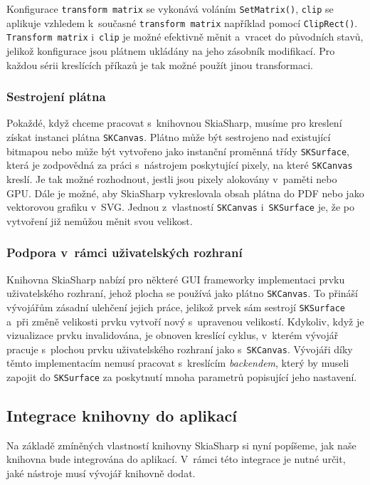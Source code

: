 Konfigurace \texttt{transform matrix} se vykonává voláním \texttt{SetMatrix()}, \texttt{clip} se aplikuje vzhledem k~současné \texttt{transform matrix} například pomocí \texttt{ClipRect()}. \texttt{Transform matrix} i~\texttt{clip} je možné efektivně měnit a~vracet do původních stavů, jelikož konfigurace jsou plátnem ukládány na jeho zásobník modifikací. Pro každou sérii kreslících příkazů je tak možné použít jinou transformaci.

\subsubsection*{Sestrojení plátna}
Pokaždé, když chceme pracovat s~knihovnou SkiaSharp, musíme pro kreslení získat instanci plátna \texttt{SKCanvas}. Plátno může být sestrojeno nad existující bitmapou nebo může být vytvořeno jako instanční proměnná třídy \texttt{SKSurface}, která je zodpovědná za práci s~nástrojem poskytující pixely, na které \texttt{SKCanvas} kreslí. Je tak možné rozhodnout, jestli jsou pixely alokovány v~paměti nebo GPU. Dále je možné, aby SkiaSharp vykreslovala obsah plátna do PDF nebo jako vektorovou grafiku v~SVG. Jednou z~vlastností \texttt{SKCanvas} i~\texttt{SKSurface} je, že po vytvoření již nemůžou měnit svou velikost.

\newpage
\subsubsection*{Podpora v~rámci uživatelských rozhraní}
\label{kap3:skia_ui_elements}
Knihovna SkiaSharp nabízí pro některé GUI frameworky implementaci prvku uživatelského rozhraní, jehož plocha se používá jako plátno \texttt{SKCanvas}.
To přináší vývojářům zásadní ulehčení jejich práce, jelikož prvek sám sestrojí \texttt{SKSurface} a~při změně velikosti prvku vytvoří nový s~upravenou velikostí. Kdykoliv, když je vizualizace prvku invalidována, je obnoven kreslící cyklus, v~kterém vývojář pracuje s~plochou prvku uživatelského rozhraní jako s~\texttt{SKCanvas}. Vývojáři díky těmto implementacím nemusí pracovat s~kreslícím \textit{backendem}, který by museli zapojit do \texttt{SKSurface} za poskytnutí mnoha parametrů popisující jeho nastavení.

\subsection{Integrace knihovny do aplikací}
Na základě zmíněných vlastností knihovny SkiaSharp si nyní popíšeme, jak naše knihovna bude integrována do aplikací. V~rámci této integrace je nutné určit, jaké nástroje musí vývojář knihovně dodat.

